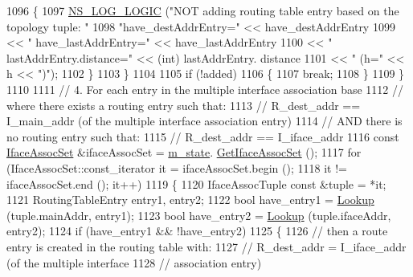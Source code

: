 \begin{DoxyCode}
1096             \{
1097               \hyperlink{group__logging_ga88acd260151caf2db9c0fc84997f45ce}{NS\_LOG\_LOGIC} (\textcolor{stringliteral}{"NOT adding routing table entry based on the topology tuple: "}
1098                             \textcolor{stringliteral}{"have\_destAddrEntry="} << have\_destAddrEntry
1099                                                   << \textcolor{stringliteral}{" have\_lastAddrEntry="} << have\_lastAddrEntry
1100                                                   << \textcolor{stringliteral}{" lastAddrEntry.distance="} << (\textcolor{keywordtype}{int}) lastAddrEntry.
      distance
1101                                                   << \textcolor{stringliteral}{" (h="} << h << \textcolor{stringliteral}{")"});
1102             \}
1103         \}
1104 
1105       \textcolor{keywordflow}{if} (!added)
1106         \{
1107           \textcolor{keywordflow}{break};
1108         \}
1109     \}
1110 
1111   \textcolor{comment}{// 4. For each entry in the multiple interface association base}
1112   \textcolor{comment}{// where there exists a routing entry such that:}
1113   \textcolor{comment}{// R\_dest\_addr == I\_main\_addr (of the multiple interface association entry)}
1114   \textcolor{comment}{// AND there is no routing entry such that:}
1115   \textcolor{comment}{// R\_dest\_addr == I\_iface\_addr}
1116   \textcolor{keyword}{const} \hyperlink{namespacens3_1_1olsr_af7456b9ea2cde8c7d88443de06c015f4}{IfaceAssocSet} &ifaceAssocSet = \hyperlink{classns3_1_1olsr_1_1RoutingProtocol_a07942ec1a7df71b609c8d2ff3b567c49}{m\_state}.
      \hyperlink{classns3_1_1olsr_1_1OlsrState_ae2958cc39b5a1e154797ad2efe462cfb}{GetIfaceAssocSet} ();
1117   \textcolor{keywordflow}{for} (IfaceAssocSet::const\_iterator it = ifaceAssocSet.begin ();
1118        it != ifaceAssocSet.end (); it++)
1119     \{
1120       IfaceAssocTuple \textcolor{keyword}{const} &tuple = *it;
1121       RoutingTableEntry entry1, entry2;
1122       \textcolor{keywordtype}{bool} have\_entry1 = \hyperlink{classns3_1_1olsr_1_1RoutingProtocol_a514bf401454b233af509476fc3fd5d6b}{Lookup} (tuple.mainAddr, entry1);
1123       \textcolor{keywordtype}{bool} have\_entry2 = \hyperlink{classns3_1_1olsr_1_1RoutingProtocol_a514bf401454b233af509476fc3fd5d6b}{Lookup} (tuple.ifaceAddr, entry2);
1124       \textcolor{keywordflow}{if} (have\_entry1 && !have\_entry2)
1125         \{
1126           \textcolor{comment}{// then a route entry is created in the routing table with:}
1127           \textcolor{comment}{//       R\_dest\_addr  =  I\_iface\_addr (of the multiple interface}
1128           \textcolor{comment}{//                                     association entry)}

\end{DoxyCode}
